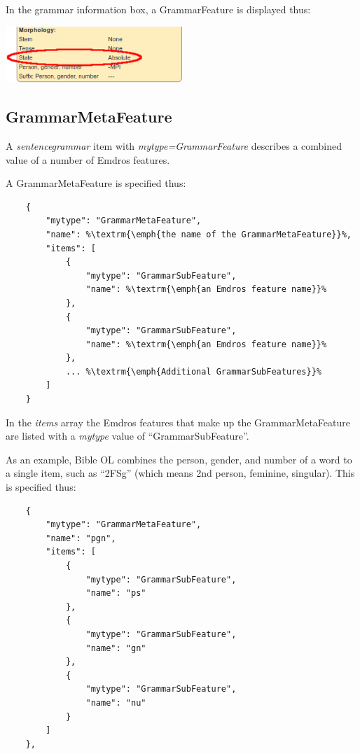 \documentclass[11pt,oneside,a4paper]{memoir}
\begin{document}
\Needspace*{5cm}%
In the grammar information box, a GrammarFeature is displayed thus:

\begin{center}
  \includegraphics[width=0.5\textwidth]{state2.png}
\end{center}


\subsection{GrammarMetaFeature}\label{gmf}

A \emph{sentencegrammar} item with \emph{mytype=GrammarFeature} describes a combined value of a
number of Emdros features.

A GrammarMetaFeature is specified thus:

\begin{lstlisting}
    {
        "mytype": "GrammarMetaFeature",
        "name": %\textrm{\emph{the name of the GrammarMetaFeature}}%,
        "items": [
            {
                "mytype": "GrammarSubFeature",
                "name": %\textrm{\emph{an Emdros feature name}}%
            },
            {
                "mytype": "GrammarSubFeature",
                "name": %\textrm{\emph{an Emdros feature name}}%
            },
            ... %\textrm{\emph{Additional GrammarSubFeatures}}%
        ]
    }
\end{lstlisting}

In the \emph{items} array the Emdros features that make up the GrammarMetaFeature are listed with a
\emph{mytype} value of ``GrammarSubFeature''.

As an example, Bible OL combines the person, gender, and number of a word to a single item, such as
``2FSg'' (which means 2nd person, feminine, singular). This is specified thus:

\begin{lstlisting}
    {
        "mytype": "GrammarMetaFeature",
        "name": "pgn",
        "items": [
            {
                "mytype": "GrammarSubFeature",
                "name": "ps"
            },
            {
                "mytype": "GrammarSubFeature",
                "name": "gn"
            },
            {
                "mytype": "GrammarSubFeature",
                "name": "nu"
            }
        ]
    },
\end{lstlisting}
\end{document}
